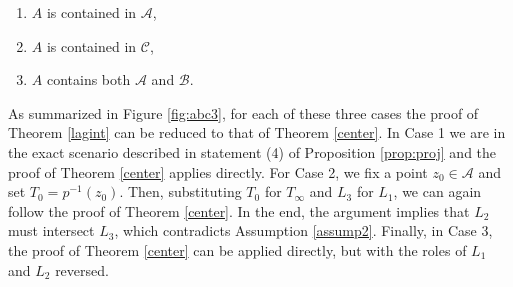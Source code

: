 \documentclass[12pt]{amsart}
\theoremstyle{definition}
\newcommand{\RR}{{\mathbb R}}
\begin{document}
\begin{enumerate}
    \item $A$ is contained in $\mathcal{A}$,
    \item $A$ is contained in $\mathcal{C}$,
    \item $A$ contains both $\mathcal{A}$ and $\mathcal{B}$.
\end{enumerate}
As summarized in Figure  \ref{fig:abc3}, for each of these three cases the proof of Theorem \ref{lagint} can be reduced to that of Theorem \ref{center}.
In Case 1 we are in the exact scenario described in statement (4) of Proposition \ref{prop:proj} and the proof of Theorem \ref{center} applies directly. For Case 2, we fix a point $z_0 \in \mathcal{A}$ and set $T_0 = p^{-1}(z_0)$. Then, substituting $T_0$ for $T_{\infty}$ and $L_3$ for $L_1$, we can again follow the proof of Theorem \ref{center}. 
In the end, the argument implies that $L_2$ must intersect $L_3$, which contradicts  Assumption \ref{assump2}.
Finally, in Case 3, the proof of Theorem \ref{center} can be applied directly, but with the roles of $L_1$ and $L_2$ reversed. 
\end{document}
